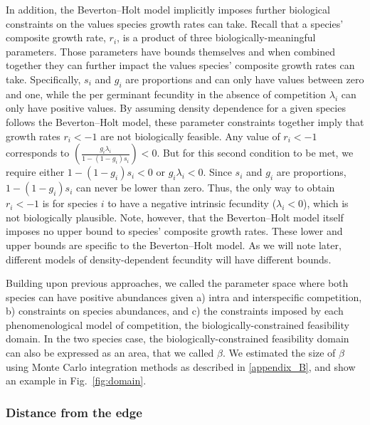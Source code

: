\begin{refsection}
In addition, the Beverton--Holt model implicitly imposes further biological constraints on the values species growth rates can take. Recall that a species' composite growth rate, $r_{i}$, is a product of three biologically-meaningful parameters. Those parameters have bounds themselves and when combined together they can further impact the values species' composite growth rates can take. Specifically, $s_{i}$ and $g_{i}$ are proportions and can only have values between zero and one, while the per germinant fecundity in the absence of competition $\lambda_{i}$ can only have positive values. By assuming density dependence for a given species follows the Beverton--Holt model, these parameter constraints together imply that growth rates $r_i < -1$ are not biologically feasible. Any value of $r_{i} < -1$ corresponds to $\left( \frac{g_{i}\lambda_{i}}{1-(1-g_{i})s_{i}} \right) < 0$. But for this second condition to be met, we require either $1-(1-g_{i})s_{i} < 0$ or $g_{i}\lambda_{i} < 0$. Since $s_{i}$ and $g_{i}$ are proportions, $1-(1-g_{i})s_{i}$ can never be lower than zero.  Thus, the only way to obtain $r_{i} < -1$ is for species $i$ to have a negative intrinsic fecundity ($\lambda_i < 0$), which is not biologically plausible. Note, however, that the Beverton--Holt model itself imposes no upper bound to species' composite growth rates. These lower and upper bounds are specific to the Beverton--Holt model. As we will note later, different models of density-dependent fecundity will have different bounds.


Building upon previous approaches, we called the parameter space where both species can have positive abundances given a) intra and interspecific competition, b) constraints on species abundances, and c) the constraints imposed by each phenomenological model of competition, the biologically-constrained feasibility domain. In the two species case,  the biologically-constrained feasibility domain can also be expressed as an area, that we called $\beta$. We estimated the size of $\beta$ using Monte Carlo integration methods as described in \autoref{appendix_B}, and show an example in Fig.~\ref{fig:domain}.


\subsubsection*{Distance from the edge}


\end{refsection}
